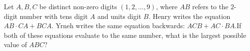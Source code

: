 Let $A, B, C$ be distinct non-zero digits $(1, 2,..., 9)$, where $AB$ refers to the $2$-digit number with tens digit $A$ and units digit $B$. Henry writes the equation $AB \cdot CA+BCA$. Yrneh writes the same equation backwards: $ACB +AC \cdot BA$.If both of these equations evaluate to the same number, what is the largest possible value of $ABC$?
